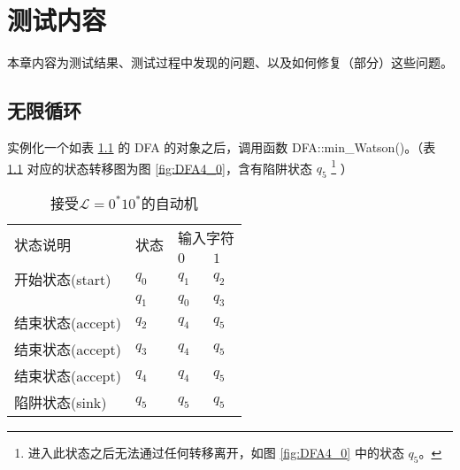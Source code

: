 \chapter{测试内容}

本章内容为测试结果、测试过程中发现的问题、以及如何修复（部分）这些问题。




\section{无限循环}\label{sec:ohloop}

实例化一个如表 \ref{tab:DFA4} 的 DFA 的对象之后，调用函数 DFA::min\_Watson()。（表 \ref{tab:DFA4} 对应的状态转移图为图 \ref{fig:DFA4_0}，含有陷阱状态 $q_5$ \footnote{进入此状态之后无法通过任何转移离开，如图 \ref{fig:DFA4_0} 中的状态 {$q_5$}。} ）

\begin{table}[!htbp]
    \caption{接受{$\mathcal{L}=0^*10^*$}的自动机{\cite{book1}}}
    \label{tab:DFA4}
    \centering
    \small%
    \setlength{\tabcolsep}{4pt}%
    \renewcommand{\arraystretch}{1.2}%
        \begin{tabular}{l p{3em}<{\centering} p{3em}<{\centering} p{3em}<{\centering}}
        \toprule %
        \multirow{2}{*}{状态说明} & \multirow{2}{*}{状态} & \multicolumn{2}{c}{输入字符} \\
		\cline{3-4}      &    &$0$ & $1$  \\
        \midrule%
        开始状态(start)  & $q_0$ & $q_1$   & $q_2$   \\
                        & $q_1$ & $q_0$   & $q_3$   \\
        结束状态(accept) & $q_2$ & $q_4$   & $q_5$   \\
        结束状态(accept) & $q_3$ & $q_4$   & $q_5$   \\
        结束状态(accept) & $q_4$ & $q_4$   & $q_5$   \\
        陷阱状态(sink) & $q_5$ & $q_5$   & $q_5$   \\
        \bottomrule%
    \end{tabular}
\end{table}

